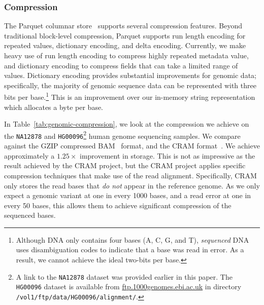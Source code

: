 \documentclass{acm_proc_article-sp}
\begin{document}
\subsubsection{Compression}
\label{sec:compression}

The Parquet columnar store~\cite{parquet} supports several compression features. Beyond traditional block-level
compression, Parquet supports run length encoding for repeated values, dictionary encoding, and delta
encoding. Currently, we make heavy use of run length encoding to compress highly repeated metadata value,
and dictionary encoding to compress fields that can take a limited range of values. Dictionary encoding provides
substantial improvements for genomic data; specifically, the majority of genomic sequence data can be
represented with three bits per base.\footnote{Although DNA only contains four bases (A, C, G, and T),
\emph{sequenced} DNA uses disambiguation codes to indicate that a base was read in error. As a result, we
cannot achieve the ideal two-bits per base.} This is an improvement over our in-memory string representation
which allocates a byte per base.

In Table~\ref{tab:genomic-compression}, we look at the compression we achieve on the \texttt{NA12878}
and \texttt{HG00096}\footnote{A link to the \texttt{NA12878} dataset was provided earlier in this paper. The
\texttt{HG00096} dataset is available from \url{ftp.1000genomes.ebi.ac.uk} in directory 
\texttt{/vol1/ftp/data/HG00096/alignment/}.} human genome sequencing samples. We compare against the
GZIP compressed BAM~\cite{li09} format, and the CRAM format~\cite{fritz11}. We achieve approximately a
$1.25\times$ improvement in storage. This is not as impressive as the result achieved by the CRAM project,
but the CRAM project applies specific compression techniques that make use of the read alignment. Specifically,
CRAM only stores the read bases that \emph{do not} appear in the reference genome. As we only expect a
genomic variant at one in every 1000 bases, and a read error at one in every 50 bases, this allows them to
achieve significant compression of the sequenced bases.
\end{document}
